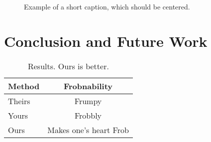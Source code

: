 \documentclass[10pt,twocolumn,letterpaper]{article}
\begin{document}
\begin{figure*}
\begin{center}
\fbox{\rule{0pt}{2in} \rule{.9\linewidth}{0pt}}
\end{center}
   \caption{Example of a short caption, which should be centered.}
\label{fig:short}
\end{figure*}

\section{Conclusion and Future Work}








\begin{table}
\begin{center}
\begin{tabular}{|l|c|}
\hline
Method & Frobnability \\
\hline\hline
Theirs & Frumpy \\
Yours & Frobbly \\
Ours & Makes one's heart Frob\\
\hline
\end{tabular}
\end{center}
\caption{Results. Ours is better.}
\end{table}






{
\small


}
\end{document}
